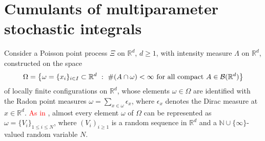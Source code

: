 \documentclass[bj,authoryear,noshowframe]{imsart}
\theoremstyle{plain}
\theoremstyle{remark}
\newcommand{\N}{\mathbb{N}}
\newcommand{\R}{\mathbb{R}}
\def\real{{\mathord{\mathbb R}}}
\begin{document}
\section{Cumulants of multiparameter stochastic integrals} 
\label{s4}
\noindent 
 Consider a Poisson point process $\Xi$ on $\R^d$, $d \geq 1$, with intensity
measure $\Lambda$ on $\real^d$, %
 constructed on the space $$
 \Omega = \big\{
 \omega = \{ x_i \}_{i\in I} \subset \R^d \ : \
 \#( A \cap \omega ) < \infty 
 \mbox{ for all compact } A\in {\cal B} (\R^d) 
 \big\}
 $$
 of locally finite configurations on $\R^d$, whose elements 
 $\omega \in \Omega$ are identified with the Radon point measures 
 $\displaystyle \omega = \sum_{x\in \omega} \epsilon_x$, 
 where $\epsilon_x$ denotes the Dirac measure at $x\in \R^d$. 
 \textcolor{red}{As in} \cite[Corollary~6.5]{LastPenrose17}, almost every
 element $ \omega$ of $\Omega$ 
 can be represented as $\omega =\{V_i\}_{1\leq i\leq N}$,
 where $(V_i)_{i\geq 1}$ is a random sequence 
 in $\R^d$ and a $\N\cup\{\infty\}$-valued random variable $N$.

 \medskip
\end{document}
